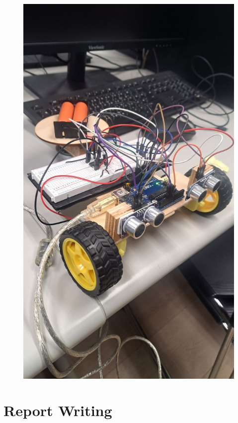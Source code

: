 \documentclass[a4paper,12pt]{./article}
\begin{document}
\begin{center}
\begin{figure}[H]
\begin{minipage}[t]{./0.45\textwidth}
\includegraphics[width=\textwidth]{./photos/h.jpg}
\end{minipage}
\hfill
\end{figure}\FloatBarrier\end{center}

\section{Report Writing}
\end{document}
